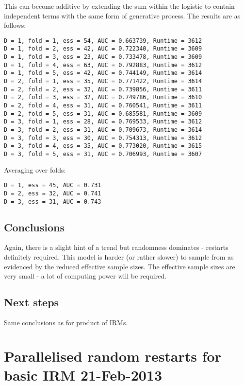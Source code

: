 \documentclass[twoside,11pt]{article}
\begin{document}
This can become additive by extending the sum within the logistic to contain independent terms with the same form of generative process.
The results are as follows:
%
\begin{lstlisting}
D = 1, fold = 1, ess = 54, AUC = 0.663739, Runtime = 3612
D = 1, fold = 2, ess = 42, AUC = 0.722340, Runtime = 3609
D = 1, fold = 3, ess = 23, AUC = 0.733478, Runtime = 3609
D = 1, fold = 4, ess = 63, AUC = 0.792883, Runtime = 3612
D = 1, fold = 5, ess = 42, AUC = 0.744149, Runtime = 3614
D = 2, fold = 1, ess = 35, AUC = 0.771422, Runtime = 3614
D = 2, fold = 2, ess = 32, AUC = 0.739856, Runtime = 3611
D = 2, fold = 3, ess = 32, AUC = 0.749786, Runtime = 3610
D = 2, fold = 4, ess = 31, AUC = 0.760541, Runtime = 3611
D = 2, fold = 5, ess = 31, AUC = 0.685581, Runtime = 3609
D = 3, fold = 1, ess = 28, AUC = 0.769533, Runtime = 3612
D = 3, fold = 2, ess = 31, AUC = 0.709673, Runtime = 3614
D = 3, fold = 3, ess = 30, AUC = 0.754313, Runtime = 3612
D = 3, fold = 4, ess = 35, AUC = 0.773020, Runtime = 3615
D = 3, fold = 5, ess = 31, AUC = 0.706993, Runtime = 3607
\end{lstlisting}
%
Averaging over folds:%
\begin{lstlisting}
D = 1, ess = 45, AUC = 0.731
D = 2, ess = 32, AUC = 0.741
D = 3, ess = 31, AUC = 0.743
\end{lstlisting}
%
\subsection{Conclusions}

Again, there is a slight hint of a trend but randomness dominates - restarts definitely required.
This model is harder (or rather slower) to sample from as evidenced by the reduced effective sample sizes.
The effective sample sizes are very small  - a lot of computing power will be required.

\subsection{Next steps}

Same conclusions as for product of IRMs.

\section{Parallelised random restarts for basic IRM 21-Feb-2013}
\end{document}
